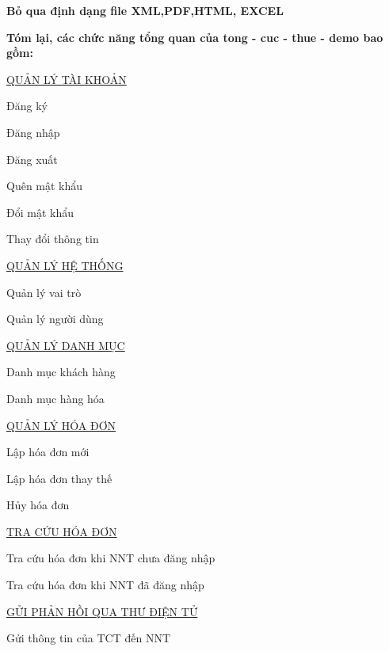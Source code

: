 \textbf{Bỏ qua định dạng file XML,PDF,HTML, EXCEL}

\textbf{Tóm lại, các chức năng tổng quan của tong - cuc - thue - demo bao gồm:}

\underline{\textsc{QUẢN LÝ TÀI KHOẢN}}

Đăng ký



Đăng nhập

Đăng xuất

Quên mật khẩu



Đổi mật khẩu

Thay đổi thông tin

\underline{\textsc{QUẢN LÝ HỆ THỐNG}}

Quản lý vai trò

Quản lý người dùng

\underline{\textsc{QUẢN LÝ DANH MỤC}}

Danh mục khách hàng

Danh mục hàng hóa

\underline{\textsc{QUẢN LÝ HÓA ĐƠN}}

Lập hóa đơn mới

Lập hóa đơn thay thế

Hủy hóa đơn

\underline{\textsc{TRA CỨU HÓA ĐƠN}}

Tra cứu hóa đơn khi NNT chưa đăng nhập

Tra cứu hóa đơn khi NNT đã đăng nhập

\underline{\textsc{GỬI PHẢN HỒI QUA THƯ ĐIỆN TỬ}}

Gửi thông tin của TCT đến NNT